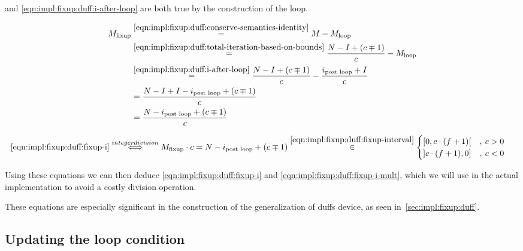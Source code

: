  and \cref{eqn:impl:fixup:duff:i-after-loop} are both true by the construction of the loop.

\begin{equation}\label{eqn:impl:fixup:duff:fixup-i}
\begin{aligned}
    M_{\text{fixup}} & \overset{\ref{eqn:impl:fixup:duff:conserve-semantics-identity}}{=} M - M_{\text{loop}} \\
    & \overset{\ref{eqn:impl:fixup:duff:total-iteration-based-on-bounds}}{=}
    \frac{N - I + (c \mp 1)}{c} - M_{\text{loop}} \\
    & \overset{\ref{eqn:impl:fixup:duff:i-after-loop}}{=}
    \frac{N - I + (c \mp 1)}{c} - \frac{i_\text{post loop} + I}{c} \\
    &= \frac{N - I + I - i_\text{post loop} + (c \mp 1)}{c}\\
    &= \frac{N - i_\text{post loop} + (c \mp 1)}{c}
\end{aligned}
\end{equation}

\begin{equation}\label{eqn:impl:fixup:duff:fixup-i-mult}
\begin{aligned}
    \ref{eqn:impl:fixup:duff:fixup-i} &\overset{integer division}{\Longleftrightarrow} M_{\text{fixup}} \cdot c = N - i_\text{post loop} + (c \mp 1) \overset{\ref{eqn:impl:fixup:duff:fixup-interval}}{\in}  \begin{cases} \lbrack 0, c \cdot (f + 1) \lbrack &, \medspace c > 0\\ \rbrack c \cdot (f + 1), 0 \rbrack &, \medspace c < 0 \end{cases} 
\end{aligned}
\end{equation}

Using these equations we can then deduce \cref{eqn:impl:fixup:duff:fixup-i} and \cref{eqn:impl:fixup:duff:fixup-i-mult}, which we will use in the actual implementation to avoid a costly division operation.

These equations are especially significant in the construction of the generalization of duffs device, as seen in~\cref{sec:impl:fixup:duff}.

\subsection{Updating the loop condition}\label{sec:impl:fixup:header-cond}

